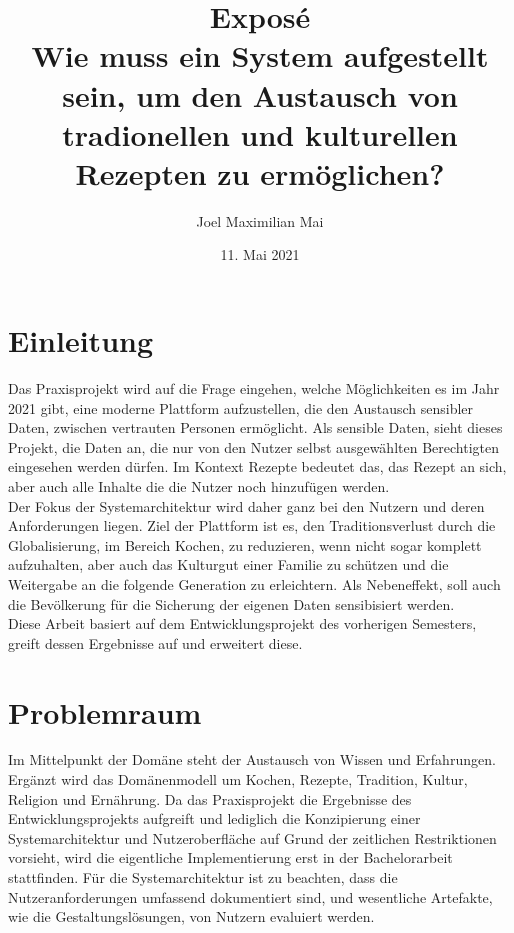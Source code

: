 \documentclass[10pt]{article}
\author{Joel Maximilian Mai}
\title{Exposé\\ Wie muss ein System aufgestellt sein, um den Austausch von tradionellen und kulturellen Rezepten zu ermöglichen?}
\date{11. Mai 2021}
\begin{document}
    \maketitle 

    \newpage

    \section{Einleitung}\label{sec:Einleitung}
    Das Praxisprojekt wird auf die Frage eingehen, welche Möglichkeiten es im Jahr 2021 gibt, eine moderne Plattform aufzustellen, die den Austausch sensibler Daten, zwischen vertrauten Personen ermöglicht. Als sensible Daten, sieht dieses Projekt, die Daten an, die nur von den Nutzer selbst ausgewählten Berechtigten eingesehen werden dürfen. Im Kontext Rezepte bedeutet das, das Rezept an sich, aber auch alle Inhalte die die Nutzer noch hinzufügen werden. \\
    Der Fokus der Systemarchitektur wird daher ganz bei den Nutzern und deren Anforderungen liegen. Ziel der Plattform ist es, den Traditionsverlust durch die Globalisierung\cite{bpb2021fastfood}\cite{bpb2021fastfoodtopic}, im Bereich Kochen, zu reduzieren, wenn nicht sogar komplett aufzuhalten, aber auch das Kulturgut einer Familie\cite[Kapitel 2.4]{karena2021} zu schützen und die Weitergabe an die folgende Generation zu erleichtern. Als Nebeneffekt, soll auch die Bevölkerung für die Sicherung der eigenen Daten sensibisiert werden.\\ 
    Diese Arbeit basiert auf dem Entwicklungsprojekt\cite{cobanmai2021} des vorherigen Semesters, greift dessen Ergebnisse auf und erweitert diese.

    \section{Problemraum}\label{sec:Problemraum}
    Im Mittelpunkt der Domäne steht der Austausch von Wissen und Erfahrungen. Ergänzt wird das Domänenmodell um Kochen, Rezepte, Tradition, Kultur, Religion und Ernährung. Da das Praxisprojekt die Ergebnisse des Entwicklungsprojekts aufgreift und lediglich die Konzipierung einer Systemarchitektur und Nutzeroberfläche auf Grund der zeitlichen Restriktionen vorsieht, wird die eigentliche Implementierung erst in der Bachelorarbeit stattfinden. Für die Systemarchitektur ist zu beachten, dass die Nutzeranforderungen umfassend dokumentiert sind, und wesentliche Artefakte, wie die Gestaltungslösungen, von Nutzern evaluiert werden.
\end{document}
